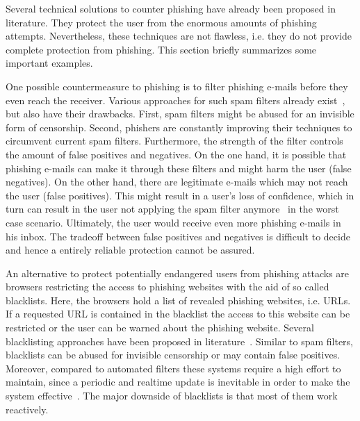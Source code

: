 Several technical solutions to counter phishing have already been proposed in literature. 
They protect the user from the enormous amounts of phishing attempts. Nevertheless, these techniques are not flawless, i.e. they do not provide complete protection from phishing. 
This section briefly summarizes some important examples.

\begin{description}[leftmargin=0cm]
	\item[E-Mail Spam Filters:] One possible countermeasure to phishing is to filter phishing e-mails before they even reach the receiver.
 Various approaches for such spam filters already exist~\cite{bergholz2010new,chandrasekaran2006phishing,fette2007learning}, but also have their drawbacks.
 First, spam filters might be abused for an invisible form of censorship.
 Second, phishers are constantly improving their techniques to circumvent current spam filters.
 Furthermore, the strength of the filter controls the amount of false positives and negatives.
 On the one hand, it is possible that phishing e-mails can make it through these filters and might harm the user (false negatives). 
On the other hand, there are legitimate e-mails which may not reach the user (false positives). 
This might result in a user's loss of confidence, which in turn can result in the user not applying the spam filter anymore~\cite{olivo2011obtaining} in the worst case scenario. Ultimately, the user would receive even more phishing e-mails in his inbox.
The tradeoff between false positives and negatives is difficult to decide and hence a entirely reliable protection cannot be assured.
	\item[URL Blacklists:] An alternative to protect potentially endangered users from phishing attacks are browsers restricting the access to phishing websites with the aid of so called blacklists.
 Here, the browsers hold a list of revealed phishing websites, i.e. URLs.
 If a requested URL is contained in the blacklist the access to this website can be restricted or the user can be warned about the phishing website.
 Several blacklisting approaches have been proposed in literature~\cite{ma2009beyond, zhang2008highly}. 
Similar to spam filters, blacklists can be abused for invisible censorship or may contain false positives.
Moreover, compared to automated filters these systems require a high effort to maintain, since a periodic and realtime update is inevitable in order to make the system effective~\cite{purkait2012phishing}.
The major downside of blacklists is that most of them work reactively.

\end{description}
